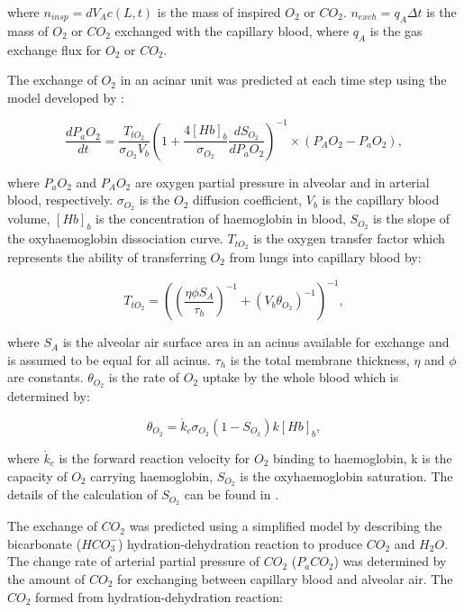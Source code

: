 \noindent where $n_{insp} = dV_A c(L,t)$ is the mass of inspired $O_2$ or $CO_2$. $n_{exch} = q_A \Delta t$ is the mass of $O_2$ or $CO_2$ exchanged with the capillary blood, where $q_A$ is the gas exchange flux for $O_2$ or $CO_2$.

The exchange of $O_2$ in an acinar unit was predicted at each time step using the model developed by \cite{ben2006simplified, swan2010evidence, swan2010multi}:

\begin{equation} 
 \label{eq:O2ExchangeEquation}
 \frac{dP_aO_2}{dt} = \frac{T_{tO_2}}{\sigma_{O_2} V_b}{(1 + \frac{4[Hb]_b}{\sigma_{O_2}}\frac{dS_{O_2}}{dP_a O_2})}^{-1} \times (P_A O_2 - P_a O_2),
\end{equation}

\noindent where $P_a O_2$ and $P_A O_2$ are oxygen partial pressure in alveolar and in arterial blood, respectively. $\sigma_{O_2}$ is the $O_2$ diffusion coefficient, $V_b$ is the capillary blood volume, $[Hb]_b$ is the concentration of haemoglobin in blood, $S_{O_2}$ is the slope of the oxyhaemoglobin dissociation curve. $T_{tO_2}$ is the oxygen transfer factor which represents the ability of transferring $O_2$ from lungs into capillary blood by:

\begin{equation} 
 \label{eq:O2TransferFactor}
 T_{tO_2} = ((\frac{\eta\phi S_A}{\tau_h})^{-1} + (V_b \theta_{O_2})^{-1})^{-1},
\end{equation}

\noindent where $S_A$ is the alveolar air surface area in an acinus available for exchange and is assumed to be equal for all acinus. $\tau_h$ is the total membrane thickness, $\eta$ and $\phi$ are constants. $\theta_{O_2}$ is the rate of $O_2$ uptake by the whole blood which is determined by:

\begin{equation} 
 \label{eq:OxygenUptakeRate}
 \theta_{O_2} = \acute{k}_c \sigma_{O_2}(1 - S_{O_2})k[Hb]_b,
\end{equation}

\noindent where $\acute{k}_c$ is the forward reaction velocity for $O_2$ binding to haemoglobin, k is the capacity of $O_2$ carrying haemoglobin, $S_{O_2}$ is the oxyhaemoglobin saturation. The details of the calculation of $S_{O_2}$ can be found in \cite{swan2010evidence, swan2010multi}.

The exchange of $CO_2$ was predicted using a simplified model by describing the bicarbonate ($HCO^{-}_3$) hydration-dehydration reaction to produce $CO_2$ and $H_2 O$. The change rate of arterial partial pressure of $CO_2$ ($P_a CO_2$) was determined by the amount of $CO_2$ for exchanging between capillary blood and alveolar air. The $CO_2$ formed from hydration-dehydration reaction:

